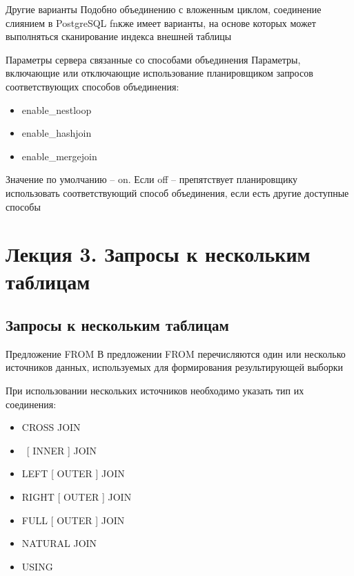 \documentclass[12pt]{article}
\begin{document}
\begin{Remark}{Другие варианты}
    Подобно объединению с вложенным циклом, соединение слиянием в PostgreSQL fnкже имеет варианты, на основе которых может выполняться сканирование индекса внешней таблицы 
\end{Remark}

\begin{nota}{Параметры сервера связанные со способами объединения}
    Параметры, включающие или отключающие использование планировщиком запросов соответствующих способов объединения:

    \begin{itemize}
        \item enable\_nestloop
        \item enable\_hashjoin
        \item enable\_mergejoin
    \end{itemize}

    Значение по умолчанию -- on. Если off -- препятствует планировщику использовать соответствующий способ объединения, если есть другие доступные способы
\end{nota}

\newpage

\section{Лекция 3. Запросы к нескольким таблицам}

\subsection{Запросы к нескольким таблицам}

\begin{defin}{Предложение FROM}
    В предложении FROM перечисляются один или несколько источников данных, используемых для формирования результирующей выборки 

    При использовании нескольких источников необходимо указать тип их соединения:

    \begin{itemize}
        \item CROSS JOIN 
        \item\ [ INNER ] JOIN 
        \item LEFT [ OUTER ] JOIN
        \item RIGHT [ OUTER ] JOIN
        \item FULL [ OUTER ] JOIN
        \item NATURAL JOIN 
        \item USING
    \end{itemize}
\end{defin}
\end{document}
